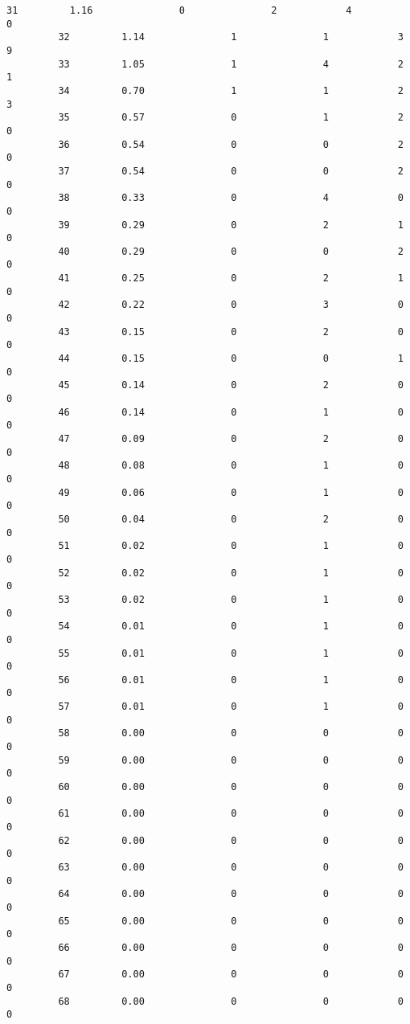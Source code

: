 \documentclass[11pt]{article}
\begin{document}
\begin{Verbatim}[commandchars=\\\{\}]
         31         1.16               0               2            4            0   
         32         1.14               1               1            3            9   
         33         1.05               1               4            2            1   
         34         0.70               1               1            2            3   
         35         0.57               0               1            2            0   
         36         0.54               0               0            2            0   
         37         0.54               0               0            2            0   
         38         0.33               0               4            0            0   
         39         0.29               0               2            1            0   
         40         0.29               0               0            2            0   
         41         0.25               0               2            1            0   
         42         0.22               0               3            0            0   
         43         0.15               0               2            0            0   
         44         0.15               0               0            1            0   
         45         0.14               0               2            0            0   
         46         0.14               0               1            0            0   
         47         0.09               0               2            0            0   
         48         0.08               0               1            0            0   
         49         0.06               0               1            0            0   
         50         0.04               0               2            0            0   
         51         0.02               0               1            0            0   
         52         0.02               0               1            0            0   
         53         0.02               0               1            0            0   
         54         0.01               0               1            0            0   
         55         0.01               0               1            0            0   
         56         0.01               0               1            0            0   
         57         0.01               0               1            0            0   
         58         0.00               0               0            0            0   
         59         0.00               0               0            0            0   
         60         0.00               0               0            0            0   
         61         0.00               0               0            0            0   
         62         0.00               0               0            0            0   
         63         0.00               0               0            0            0   
         64         0.00               0               0            0            0   
         65         0.00               0               0            0            0   
         66         0.00               0               0            0            0   
         67         0.00               0               0            0            0   
         68         0.00               0               0            0            0   
         

\end{Verbatim}
\end{document}
